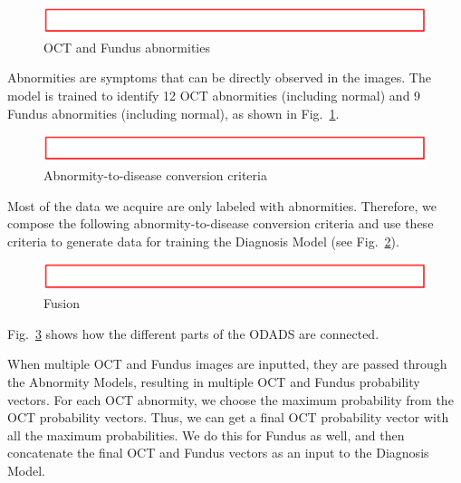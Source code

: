 \documentclass{article}
\begin{document}
		\begin{figure}[htbp]
			\centering
			\includegraphics[width=\linewidth]{Figs/Temp.png}
			\caption{OCT and Fundus abnormities}
			\vspace{0.3cm}
			\label{fig:abnormities}
		\end{figure}
		
		Abnormities are symptoms that can be directly observed in the images. The model is trained to identify 12 OCT abnormities (including normal) and 9 Fundus abnormities (including normal), as shown in Fig.~\ref{fig:abnormities}.
		
		\begin{figure}[htbp]
			\centering
			\includegraphics[width=\linewidth]{Figs/Temp.png}
			\caption{Abnormity-to-disease conversion criteria}
			\vspace{0.3cm}
			\label{fig:criteria}
		\end{figure}
		
		Most of the data we acquire are only labeled with abnormities. Therefore, we compose the following abnormity-to-disease conversion criteria and use these criteria to generate data for training the Diagnosis Model (see Fig.~\ref{fig:criteria}). 
		
		\begin{figure}[htbp]
			\centering
			\includegraphics[width=\linewidth]{Figs/Temp.png}
			\caption{Fusion}
			\vspace{0.3cm}
			\label{fig:fusion}
		\end{figure}
		
		Fig.~\ref{fig:fusion} shows how the different parts of the ODADS are connected.
		
		When multiple OCT and Fundus images are inputted, they are passed through the Abnormity Models, resulting in multiple OCT and Fundus probability vectors. For each OCT abnormity, we choose the maximum probability  from the OCT probability vectors. Thus, we can get a final OCT probability vector with all the maximum probabilities. We do this for Fundus as well, and then concatenate the final OCT and Fundus vectors as an input to the Diagnosis Model.
		
\end{document}
